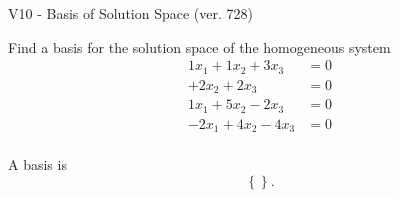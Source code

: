\begin{exercise}
  \begin{exerciseTitle}V10 - Basis of Solution Space (ver. 728)\end{exerciseTitle}
  \begin{exerciseStatement}
    Find a basis for the solution space of the homogeneous system 
\begin{align*}
 1 x_ 1 + 1 x_ 2 + 3 x_ 3 &= 0  \\ 
  + 2 x_ 2 + 2 x_ 3 &= 0  \\ 
  1 x_ 1 + 5 x_ 2 -2 x_ 3 &= 0  \\ 
  -2 x_ 1 + 4 x_ 2 -4 x_ 3 &= 0  \\ 
 \end{align*}


 
  \end{exerciseStatement}

  \begin{exerciseAnswer}
   A basis is   
\[\left\{\right\}.\]

  


  \end{exerciseAnswer}
\end{exercise}